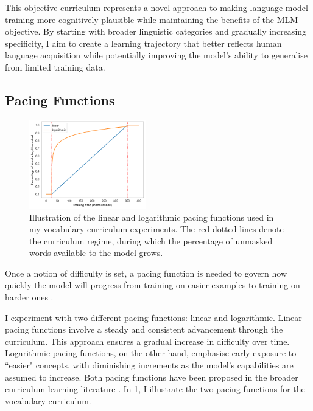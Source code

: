 This objective curriculum represents a novel approach to making language model training more cognitively plausible while maintaining the benefits of the MLM objective. By starting with broader linguistic categories and gradually increasing specificity, I aim to create a learning trajectory that better reflects human language acquisition while potentially improving the model's ability to generalise from limited training data.

\subsection{Pacing Functions} 

\begin{figure}
    \centering
    \includegraphics[width=0.45\textwidth]{chapters/climb/figures/pacing_fns.png}
    \caption{Illustration of the linear and logarithmic pacing functions used in my vocabulary curriculum experiments. The red dotted lines denote the curriculum regime, during which the percentage of unmasked words available to the model grows.}
    \label{fig:pacing_fn}
\end{figure}

Once a notion of difficulty is set, a pacing function is needed to govern how quickly the model will progress from training on easier examples to training on harder ones \citep{wu2021when}.

I experiment with two different pacing functions: linear and logarithmic. Linear pacing functions involve a steady and consistent advancement through the curriculum. This approach ensures a gradual increase in difficulty over time. Logarithmic pacing functions, on the other hand, emphasise early exposure to ``easier" concepts, with diminishing increments as the model's capabilities are assumed to increase. Both pacing functions have been proposed in the broader curriculum learning literature \citep{bai2022better, li2021curriculum, wu2021when}. In \cref{fig:pacing_fn}, I illustrate the two pacing functions for the vocabulary curriculum.

